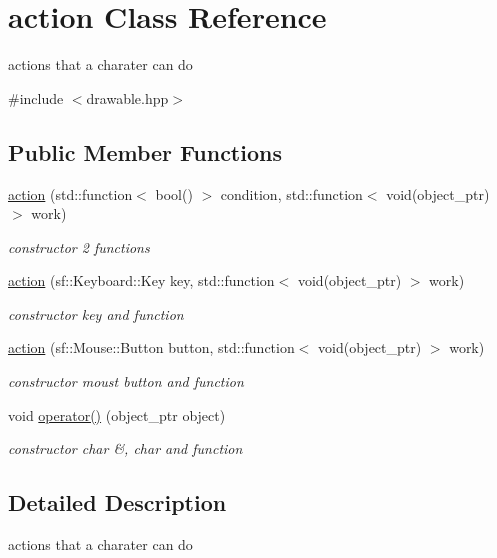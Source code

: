 \hypertarget{classaction}{}\section{action Class Reference}
\label{classaction}


actions that a charater can do  




{\ttfamily \#include $<$drawable.\+hpp$>$}

\subsection*{Public Member Functions}
\begin{DoxyCompactItemize}
\item 
\hyperlink{classaction_a481b1b2e3892600143fd7b2db4ac5729}{action} (std\+::function$<$ bool() $>$ condition, std\+::function$<$ void(object\+\_\+ptr) $>$ work)
\begin{DoxyCompactList}\small\item\em constructor 2 functions \end{DoxyCompactList}\item 
\hyperlink{classaction_a504531cbc56e9c4a60b4e5d40bc018a6}{action} (sf\+::\+Keyboard\+::\+Key key, std\+::function$<$ void(object\+\_\+ptr) $>$ work)
\begin{DoxyCompactList}\small\item\em constructor key and function \end{DoxyCompactList}\item 
\hyperlink{classaction_abf43e8dfaeca2df9d356fbfd4d1790ba}{action} (sf\+::\+Mouse\+::\+Button button, std\+::function$<$ void(object\+\_\+ptr) $>$ work)
\begin{DoxyCompactList}\small\item\em constructor moust button and function \end{DoxyCompactList}\item 
void \hyperlink{classaction_ab4f8d0f7552450455977d09a889c18c7}{operator()} (object\+\_\+ptr object)
\begin{DoxyCompactList}\small\item\em constructor char \&, char and function \end{DoxyCompactList}\end{DoxyCompactItemize}


\subsection{Detailed Description}
actions that a charater can do 

